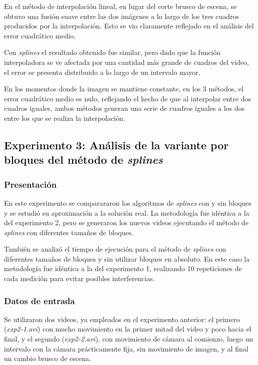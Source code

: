             En el método de interpolación lineal, en lugar del corte brusco de escena, se obtuvo una fusión suave entre las dos imágenes a lo largo de los tres cuadros producidos por la interpolación. Esto se vio claramente reflejado en el análisis del error cuadrático medio.

            Con \emph{splines} el resultado obtenido fue similar, pero dado que la función interpoladora se ve afectada por una cantidad más grande de cuadros del video, el error se presenta distribuido a lo largo de un intervalo mayor.

            En los momentos donde la imagen se mantiene constante, en los 3 métodos, el error cuadrático medio es nulo, reflejando el hecho de que al interpolar entre dos cuadros iguales, ambos métodos generan una serie de cuadros iguales a los dos entre los que se realiza la interpolación.

    \subsection{Experimento 3: Análisis de la variante por bloques del método de \emph{splines}}

        \subsubsection*{Presentación}

            En este experimento se comparararon los algoritmos de \emph{splines} con y sin bloques y se estudió su aproximación a la solución real. La metodología fue idéntica a la del experimento 2, pero se generaron los nuevos videos ejecutando el método de \emph{splines} con diferentes tamaños de bloques.

            También se analizó el tiempo de ejecución para el método de \emph{splines} con diferentes tamaños de bloques y sin utilizar bloques en absoluto. En este caso la metodología fue idéntica a la del experimento 1, realizando 10 repeticiones de cada medición para evitar posibles interferencias.

            \subsubsection*{Datos de entrada}

            Se utilizaron dos videos, ya empleados en el experimento anterior: el primero (\emph{exp2-1.avi}) con mucho movimiento en la primer mitad del video y poco hacia el final, y el segundo (\emph{exp2-2.avi}), con movimiento de cámara al comienzo, luego un intervalo con la cámara prácticamente fija, sin movimiento de imagen, y al final un cambio brusco de escena.

